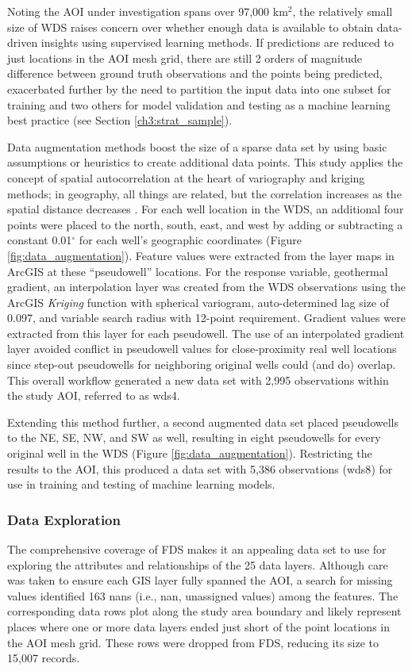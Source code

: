 Noting the AOI under investigation spans over 97,000 km$^2$, the relatively small size of WDS raises concern over whether enough data is available to obtain data-driven insights using supervised learning methods. If predictions are reduced to just locations in the AOI mesh grid, there are still 2 orders of magnitude difference between ground truth observations and the points being predicted, exacerbated further by the need to partition the input data into one subset for training and two others for model validation and testing as a machine learning best practice \citep[e.g.,][p.\ 222]{hastie_elements_2009} (see Section \ref{ch3:strat_sample}). 

Data augmentation methods boost the size of a sparse data set by using basic assumptions or heuristics to create additional data points. This study applies the concept of spatial autocorrelation at the heart of variography and kriging methods; in geography, all things are related, but the correlation increases as the spatial distance decreases \citep[Chapter\ 13]{gimond_intro_2021}. For each well location in the WDS, an additional four points were placed to the north, south, east, and west by adding or subtracting a constant 0.01$^\circ$ for each well’s geographic coordinates (Figure \ref{fig:data_augmentation}). Feature values were extracted from the layer maps in ArcGIS at these ``pseudowell'' locations. For the response variable, geothermal gradient, an interpolation layer was created from the WDS observations using the ArcGIS \textit{Kriging} function with spherical variogram, auto-determined lag size of 0.097, and variable search radius with 12-point requirement. Gradient values were extracted from this layer for each pseudowell. The use of an interpolated gradient layer avoided conflict in pseudowell values for close-proximity real well locations since step-out pseudowells for neighboring original wells could (and do) overlap. This overall workflow generated a new data set with 2,995 observations within the study AOI, referred to as \acrshort{wds4}. 

Extending this method further, a second augmented data set placed pseudowells to the NE, SE, NW, and SW as well, resulting in eight pseudowells for every original well in the WDS (Figure \ref{fig:data_augmentation}). Restricting the results to the AOI, this produced a data set with 5,386 observations (\acrshort{wds8}) for use in training and testing of machine learning models.

\subsubsection{Data Exploration}
The comprehensive coverage of FDS makes it an appealing data set to use for exploring the attributes and relationships of the 25 data layers. Although care was taken to ensure each GIS layer fully spanned the AOI, a search for missing values identified 163 \acrshort{nan}s (i.e., \acrlong{nan}, unassigned values) among the features. The corresponding data rows plot along the study area boundary and likely represent places where one or more data layers ended just short of the point locations in the AOI mesh grid. These rows were dropped from FDS, reducing its size to 15,007 records.

